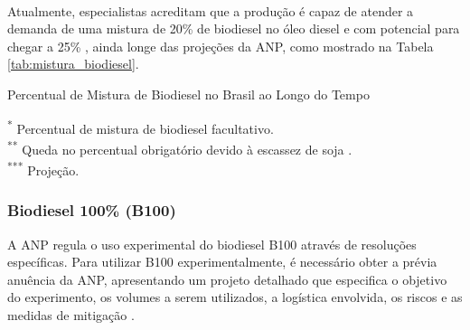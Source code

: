 \paragraph{} Atualmente, especialistas acreditam que a produção é capaz de atender a demanda de uma mistura de 20\% de biodiesel no óleo diesel e com potencial para chegar a 25\% \cite{canalrural_biodiesel}, ainda longe das projeções da \ac{ANP}, como mostrado na Tabela \ref{tab:mistura_biodiesel}.


\begin{table}[htbp]
	\begin{center}
		\caption{Percentual de Mistura de Biodiesel no Brasil ao Longo do Tempo}
		\label{tab:mistura_biodiesel}
		
		\begin{minipage}{\textwidth}
			\footnotesize
			\textsuperscript{*} Percentual de mistura de biodiesel facultativo. \\
			\textsuperscript{**} Queda no percentual obrigatório devido à escassez de soja \cite{g12020}. \\
			\textsuperscript{***} Projeção. \\
		\end{minipage}
	\end{center}
\end{table}

\subsubsection{Biodiesel 100\% (B100)}

A \ac{ANP} regula o uso experimental do biodiesel B100 através de resoluções específicas. Para utilizar B100 experimentalmente, é necessário obter a prévia anuência da ANP, apresentando um projeto detalhado que especifica o objetivo do experimento, os volumes a serem utilizados, a logística envolvida, os riscos e as medidas de mitigação \cite{ANP910_2022}.